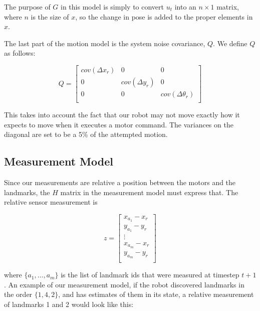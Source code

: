 \documentclass[prodmode,acmtecs]{acmsmall} %
\begin{document}
The purpose of $G$ in this model is simply to convert $u_t$ into an $n\times 1$ matrix, where $n$ is the size of $x$, so the change in pose is added to the proper elements in $x$.

The last part of the motion model is the system noise covariance, $Q$. We define $Q$ as follows:

$$
Q = 
\begin{bmatrix}
    cov(\Delta x_r) & 0               & 0 \\
    0               & cov(\Delta y_r) & 0 \\
    0               & 0               & cov(\Delta \theta_r) \\
\end{bmatrix}
$$

This takes into account the fact that our robot may not move exactly how it expects to move when it executes a motor command. The variances on the diagonal are set to be a 5\% of the attempted motion.

\subsection{Measurement Model}

Since our measurements are relative a position between the motors and the landmarks, the $H$ matrix in the measurement model must express that. The relative sensor measurement is

$$
z = 
\begin{bmatrix}
    x_{a_1} - x_r \\
    y_{a_1} - y_r \\
    \vdots\\
    x_{a_m} - x_r \\
    y_{a_m} - y_r \\
\end{bmatrix}
$$ 

where $\{a_1,\ldots,a_m\}$ is the list of landmark ids that were measured at timestep $t+1$. An example of our measurement model, if the robot discovered landmarks in the order $\{1,4,2\}$, and has estimates of them in its state, a relative measurement of landmarks 1 and 2 would look like this:
\end{document}
